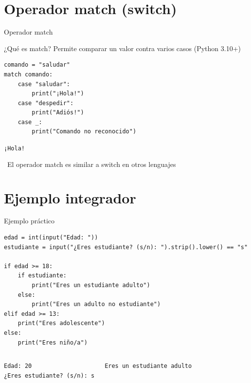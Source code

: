 \documentclass{beamer}
\begin{document}
\section{Operador match (switch)}

\begin{frame}[fragile]{Operador match \ \faRandom}
\begin{conceptbox}{¿Qué es match?}
Permite comparar un valor contra varios casos (Python 3.10+)
\end{conceptbox}

\begin{lstlisting}
comando = "saludar"
match comando:
    case "saludar":
        print("¡Hola!")
    case "despedir":
        print("Adiós!")
    case _:
        print("Comando no reconocido")
\end{lstlisting}

\vspace{-0.2cm}
\begin{tcolorbox}[colback=green!10,colframe=green,title={\small\faArrowCircleRight \ Salida},coltitle=fg0,left=3pt,right=3pt,top=2pt,bottom=2pt,boxsep=1pt]
\small\texttt{¡Hola!}
\end{tcolorbox}

\vspace{-0.1cm}
\begin{notebox}
\small\faInfoCircle \ El operador match es similar a switch en otros lenguajes
\end{notebox}
\end{frame}

\section{Ejemplo integrador}

\begin{frame}[fragile]{Ejemplo práctico \ \faUserCheck}
\begin{lstlisting}
edad = int(input("Edad: "))
estudiante = input("¿Eres estudiante? (s/n): ").strip().lower() == "s"

if edad >= 18:
    if estudiante:
        print("Eres un estudiante adulto")
    else:
        print("Eres un adulto no estudiante")
elif edad >= 13:
    print("Eres adolescente")
else:
    print("Eres niño/a")
\end{lstlisting}

\vspace{0.2cm}
\begin{columns}[T]
\begin{tcolorbox}[colback=blue!10,colframe=blue,title={\small\faArrowDown \ Entrada},coltitle=fg0,left=2pt,right=2pt,top=2pt,bottom=2pt]
\small\texttt{Edad: 20\\
¿Eres estudiante? (s/n): s}
\end{tcolorbox}

\begin{tcolorbox}[colback=green!10,colframe=green,title={\small\faArrowUp \ Salida},coltitle=fg0,left=2pt,right=2pt,top=2pt,bottom=2pt]
\small\texttt{Eres un estudiante adulto}
\end{tcolorbox}
\end{columns}
\end{frame}
\end{document}
